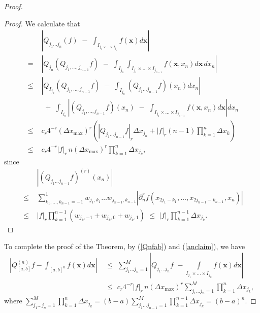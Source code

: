\documentclass{birkjour}
\theoremstyle{definition}
\theoremstyle{remark}
\numberwithin{equation}{section}
\begin{document}
\begin{proof}
\begin{proof} 
We calculate that 
\begin{align} 
&\left| Q_{j_1 \dots j_n}(f) \,\,-\,\, \int_{I_{j_1 \times \dots \times I_{j_n}}}   f(\mathbf{x}) d\mathbf{x}  \right| 
 \nonumber
\\
\,\,=\,\,& \left| 
Q_{j_n}(Q_{j_1,\dots,j_{n-1}} f) \,\,-\,\,  \int_{I_{j_n}}\int_{I_{j_1} \times \dots \times I_{j_{n-1}}}  f(\mathbf{x}, x_n) d\mathbf{x} \,dx_n  \right|
 \nonumber
\\
\,\,\leq\,\, & \left| Q_{I_{j_n}} (Q_{j_1,\dots,j_{n-1}} f) \,\,-\,\, \int_{I_{j_n}} (Q_{j_1 \dots j_{n-1}} f)(x_n) dx_n  \right|
 \nonumber 
\\
&\,\,+\,\,   \int_{I_{j_n}} \left| (Q_{j_1,\dots,j_{n-1}} f)(x_n)\,\, -\,\, 
\int_{I_{j_1} \times \dots \times I_{j_{n-1}}}  f(\mathbf{x}, x_n) d\mathbf{x}  \right| dx_n
 \nonumber 
\\  
\,\,\leq\,\, & c_r 4^{-r} (\Delta x_{\operatorname{max}})^{r}  
\left( | Q_{j_1 \dots j_{n-1}} f |_r \Delta x_{j_n}  
+  |f|_r (n-1)     \prod\limits_{k=1}^{n} \Delta x_k   \right)
\nonumber 
\\
\,\,\leq\,\,&   c_r 4^{-r}|f|_r \,n     (\Delta x_{\operatorname{max}})^{r}  
     \prod\limits_{k=1}^n \Delta x_{j_k},
     \nonumber
 \end{align}
since 
\begin{align}
&\left| (Q_{j_1 \dots j_{n-1}} f)^{(r)}(x_n) \right| 
\nonumber
\\
\,\,\leq\,\,&
\sum_{k_1,\dots,k_{n-1} = -1}^1 \!\!\!\!\! \!\!\! w_{j_1,k_1} \dots w_{j_{n-1},k_{n-1}} \left| \partial_n^r f(x_{2j_1 - k_1}, \dots, x_{2j_{n-1} - k_{n-1}}, x_n) \right|
\nonumber 
\\ 
\,\,\leq\,\,&  |f|_r  \prod\limits_{k=1}^{n-1}(w_{j_k,-1} + w_{j_k,0} + w_{j_k,1})
\,\,\leq\,\,  |f|_r  \prod\limits_{k=1}^{n-1} \Delta x_{j_k}.
\nonumber
\end{align}
\end{proof}
To complete the proof of the Theorem, by (\ref{Qnfab}) and (\ref{anclaim}), we have
\begin{align}
\left | Q_{[a,b]}^{(n)}f  - \int_{[a,b]^n}  f(\mathbf{x}) d\mathbf{x} \right|
&\,\,\leq\,\, 
\sum\limits_{j_1 \dots j_n = 1}^M \left| 
Q_{j_1 \dots j_n} f  \,\,- 
\int\limits_{I_{j_1}\times \dots \times I_{j_n}} f(\mathbf{x}) d\mathbf{x} 
\right|
\nonumber
\\
&\,\,\leq\,\, 
c_r 4^{-r}|f|_r \,n     (\Delta x_{\operatorname{max}})^{r}  
   \sum\limits_{j_1 \dots j_n = 1}^M   \prod\limits_{k=1}^n \Delta x_{j_k},
\end{align}
where
$ \sum\limits_{j_1 \dots j_n = 1}^M   \prod\limits_{k=1}^n \Delta x_{j_k} =
(b-a)  \sum\limits_{j_1 \dots j_{n-1} = 1}^M   \prod\limits_{k=1}^{n-1} \Delta x_{j_k}
= (b-a)^n$.
\end{proof}
\end{document}
